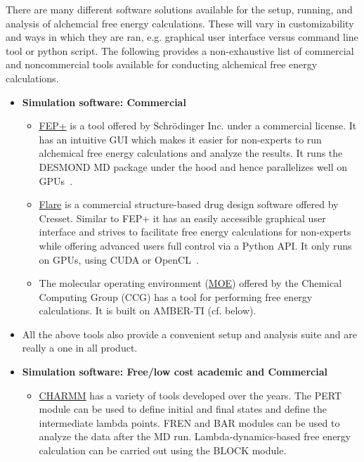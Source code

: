 \documentclass[9pt,bestpractices]{livecoms}
\begin{document}
\label{sec:software}
There are many different software solutions available for the setup, running, and analysis of alchemcial free energy calculations. These will vary in customizability and ways in which they are ran, e.g. graphical user interface versus command line tool or python script. The following provides a non-exhaustive list of commercial and noncommercial tools available for conducting alchemical free energy calculations. 
\begin{itemize}

\item [] \textbf{Simulation software: Commercial}
   \begin{itemize}
    \item \href{https://www.schrodinger.com/fep}{FEP+} is a tool offered by Schr\"{o}dinger Inc. under a commercial license. It has an intuitive GUI which makes it easier for non-experts to run alchemical free energy calculations and analyze the results. It runs the DESMOND MD package under the hood and hence parallelizes well on GPUs~\cite{wang2015accurate}. 
    \item \href{https://www.cresset-group.com/software/flare/}{Flare} is a commercial structure-based drug design software offered by Cresset. Similar to FEP+ it has an easily accessible graphical user interface and strives to facilitate free energy calculations for non-experts while offering advanced users full control via a Python API. It only runs on GPUs, using CUDA or OpenCL~\cite{kuhn2020assessmenta}.
    \item The molecular operating environment (\href{https://www.chemcomp.com/Products.htm}{MOE}) offered by the Chemical Computing Group (CCG) has a tool for performing free energy calculations. It is built on AMBER-TI (cf. below).
    \end{itemize}
    \item[]All the above tools also provide a convenient setup and analysis suite and are really a one in all product. 
\item [] \textbf{Simulation software: Free/low cost academic and Commercial}
	\begin{itemize}
	\item \href{https://www.charmm.org/}{CHARMM} has a variety of tools developed over the years. The PERT module can be used to define initial and final states and define the intermediate lambda points. FREN and BAR modules can be used to analyze the data after the MD run. Lambda-dynamics-based free energy calculation can be carried out using the BLOCK module.  

\end{itemize}
\end{itemize}
\end{document}
